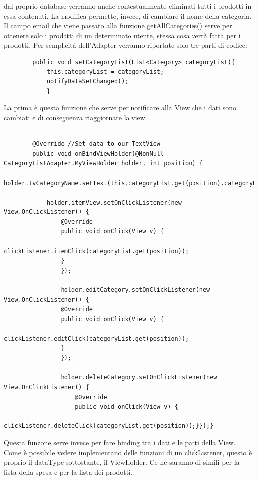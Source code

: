 \documentclass[12pt]{article}
\begin{document}
    dal proprio database verranno anche contestualmente eliminati tutti i prodotti in essa contenuti. La modifica permette,
    invece, di cambiare il nome della categoria. Il campo email che viene passato alla funzione getAllCategories() serve
    per ottenere solo i prodotti di un determinato utente, stessa cosa verrà fatta per i prodotti. 
    Per semplicità dell'Adapter verranno riportate solo tre parti di codice: 
    \begin{lstlisting}
        public void setCategoryList(List<Category> categoryList){
            this.categoryList = categoryList;
            notifyDataSetChanged();
            }
    \end{lstlisting}
    La prima è questa funzione che serve per notificare alla View che i dati sono cambiati e di conseguenza riaggiornare la view.
    \begin{lstlisting}
        
        @Override //Set data to our TextView
        public void onBindViewHolder(@NonNull CategoryListAdapter.MyViewHolder holder, int position) {
            holder.tvCategoryName.setText(this.categoryList.get(position).categoryName);
            
            holder.itemView.setOnClickListener(new View.OnClickListener() {
                @Override
                public void onClick(View v) {
                    clickListener.itemClick(categoryList.get(position));
                }
                });
                
                holder.editCategory.setOnClickListener(new View.OnClickListener() {
                @Override
                public void onClick(View v) {
                    clickListener.editClick(categoryList.get(position));
                }
                });
                
                holder.deleteCategory.setOnClickListener(new View.OnClickListener() {
                    @Override
                    public void onClick(View v) {
                        clickListener.deleteClick(categoryList.get(position));}});}
    \end{lstlisting}    
    Questa funzone serve invece per fare binding tra i dati e le parti della View. Come è possibile vedere
    implementano delle funzioni di un clickListener, questo è proprio il dataType sottostante, il ViewHolder. 
    Ce ne saranno di simili per la lista della spesa e per la lista dei prodotti.
\end{document}
